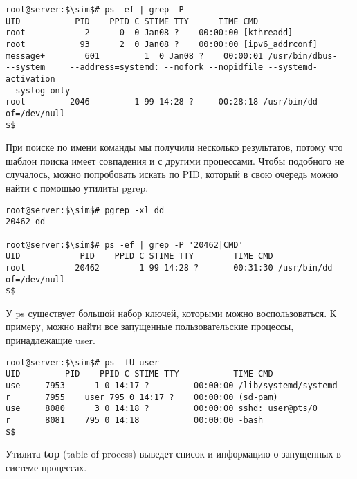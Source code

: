 \documentclass[14pt, a4paper]{article}
\begin{document}
\vspace{0.3cm}

\begin{lstlisting}
root@server:$\sim$# ps -ef | grep -P
UID           PID    PPID C STIME TTY      TIME CMD
root            2      0  0 Jan08 ?    00:00:00 [kthreadd]
root           93      2  0 Jan08 ?    00:00:00 [ipv6_addrconf]
message+        601         1  0 Jan08 ?    00:00:01 /usr/bin/dbus-
--system     --address=systemd: --nofork --nopidfile --systemd-activation
--syslog-only
root         2046         1 99 14:28 ?     00:28:18 /usr/bin/dd
of=/dev/null
$$

\end{lstlisting}
\vspace{0.2cm}

При поиске по имени команды мы получили несколько результатов, потому что шаблон поиска имеет
совпадения и с другими процессами. Чтобы подобного не случалось, можно попробовать искать по
PID, который в свою очередь можно найти с помощью утилиты pgrep.

\vspace{0.3cm}

\begin{lstlisting}
root@server:$\sim$# pgrep -xl dd
20462 dd

root@server:$\sim$# ps -ef | grep -P '20462|CMD'
UID            PID    PPID C STIME TTY        TIME CMD
root          20462        1 99 14:28 ?       00:31:30 /usr/bin/dd
of=/dev/null
$$
\end{lstlisting}
\vspace{0.2cm}

У ps существует большой набор ключей, которыми можно воспользоваться. К примеру, можно найти
все запущенные пользовательские процессы, принадлежащие user.

\vspace{0.3cm}

\begin{lstlisting}
root@server:$\sim$# ps -fU user
UID         PID    PPID C STIME TTY           TIME CMD
use     7953      1 0 14:17 ?         00:00:00 /lib/systemd/systemd --
r       7955    user 795 0 14:17 ?    00:00:00 (sd-pam)
use     8080      3 0 14:18 ?         00:00:00 sshd: user@pts/0
r       8081    795 0 14:18           00:00:00 -bash
$$
\end{lstlisting}
\newpage

Утилита \textbf{top} (table of process) выведет список и информацию о запущенных в системе процессах.
\end{document}
